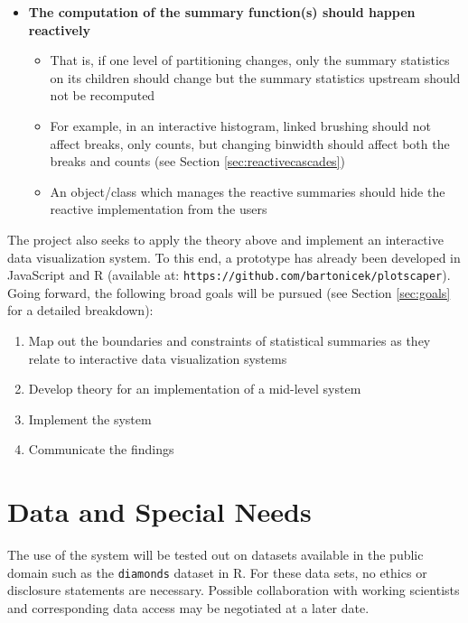 \documentclass[12pt,a4paper]{article}
\begin{document}
\begin{itemize}
\item \textbf{The computation of the summary function(s) should happen reactively}
  \begin{itemize}
  \item That is, if one level of partitioning changes, only the summary statistics on its children should change but the summary statistics upstream should not be recomputed
  \item For example, in an interactive histogram, linked brushing should not affect breaks, only counts, but changing binwidth should affect both the breaks and counts (see Section \ref{sec:reactivecascades})
  \item An object/class which manages the reactive summaries should hide the reactive implementation from the users
  \end{itemize}

\end{itemize}



The project also seeks to apply the theory above and implement an interactive data visualization system. To this end, a prototype has already been developed in JavaScript and R (available at: \texttt{https://github.com/bartonicek/plotscaper}). Going forward, the following broad goals will be pursued (see Section \ref{sec:goals} for a detailed breakdown):  

\begin{enumerate}

\item Map out the boundaries and constraints of statistical summaries as they relate to interactive data visualization systems 
\item Develop theory for an implementation of a mid-level system
\item Implement the system
\item Communicate the findings

\end{enumerate}


\section{Data and Special Needs}
\label{sec:data}

The use of the system will be tested out on datasets available in the public domain such as the \texttt{diamonds} dataset in R. For these data sets, no ethics or disclosure statements are necessary. Possible collaboration with working scientists and corresponding data access may be negotiated at a later date.  
\end{document}
